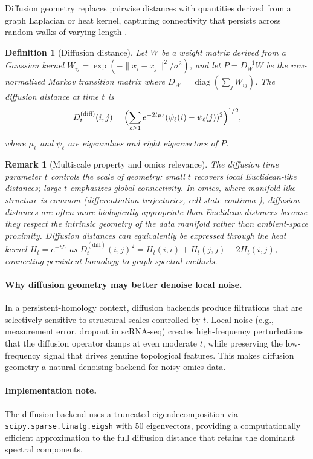 \documentclass[11pt]{article}
\newtheorem{definition}[theorem]{Definition}
\newtheorem{remark}[theorem]{Remark}
\begin{document}
Diffusion geometry replaces pairwise distances with quantities derived from a graph Laplacian or heat kernel, capturing connectivity that persists across random walks of varying length \cite{coifman2006diffusion}.

\begin{definition}[Diffusion distance]\label{def:diffusion}
Let $W$ be a weight matrix derived from a Gaussian kernel $W_{ij} = \exp(-\|x_i - x_j\|^2 / \sigma^2)$, and let $P = D_W^{-1} W$ be the row-normalized Markov transition matrix where $D_W = \operatorname{diag}(\sum_j W_{ij})$.
The \emph{diffusion distance} at time $t$ is
\[
D^{(\text{diff})}_{t}(i,j) = \Bigl( \sum_{\ell \ge 1} e^{-2t\mu_\ell} (\psi_\ell(i) - \psi_\ell(j))^2 \Bigr)^{1/2},
\]
where $\mu_\ell$ and $\psi_\ell$ are eigenvalues and right eigenvectors of $P$.
\end{definition}

\begin{remark}[Multiscale property and omics relevance]\label{rem:diffusion_multiscale}
The diffusion time parameter $t$ controls the scale of geometry: small $t$ recovers local Euclidean-like distances; large $t$ emphasizes global connectivity.
In omics, where manifold-like structure is common (differentiation trajectories, cell-state continua \cite{haghverdi2016}), diffusion distances are often more biologically appropriate than Euclidean distances because they respect the intrinsic geometry of the data manifold rather than ambient-space proximity.
Diffusion distances can equivalently be expressed through the heat kernel $H_t = e^{-tL}$ as $D^{(\text{diff})}_t(i,j)^2 = H_t(i,i) + H_t(j,j) - 2H_t(i,j)$, connecting persistent homology to graph spectral methods.
\end{remark}

\paragraph{Why diffusion geometry may better denoise local noise.}
In a persistent-homology context, diffusion backends produce filtrations that are selectively sensitive to structural scales controlled by $t$.
Local noise (e.g., measurement error, dropout in scRNA-seq) creates high-frequency perturbations that the diffusion operator damps at even moderate $t$, while preserving the low-frequency signal that drives genuine topological features.
This makes diffusion geometry a natural denoising backend for noisy omics data.

\paragraph{Implementation note.}
The diffusion backend uses a truncated eigendecomposition via \texttt{scipy.sparse.linalg.eigsh} with 50 eigenvectors, providing a computationally efficient approximation to the full diffusion distance that retains the dominant spectral components.
\end{document}
